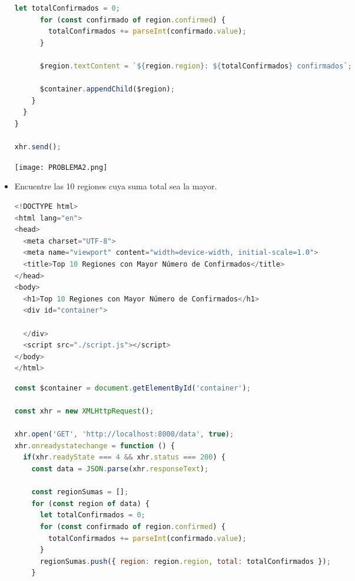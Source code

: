 \documentclass{article}
\begin{document}
\begin{itemize}
\begin{lstlisting}[language=JavaScript, caption=PROBLEMA2-SCRIPT]
      let totalConfirmados = 0;
      for (const confirmado of region.confirmed) {
        totalConfirmados += parseInt(confirmado.value);
      }

      $region.textContent = `${region.region}: ${totalConfirmados} confirmados`;
      
      $container.appendChild($region);
    }
  }
}

xhr.send();
            \end{lstlisting}  

            \newline \newline \newline
            \texttt{[image: PROBLEMA2.png]}
            \newline \newline \newline

            \item Encuentre las 10 regiones cuya suma total sea la mayor.
            
            \begin{lstlisting}[language=JavaScript, caption=PROBLEMA3-INDEX]
<!DOCTYPE html>
<html lang="en">
<head>
  <meta charset="UTF-8">
  <meta name="viewport" content="width=device-width, initial-scale=1.0">
  <title>Top 10 Regiones con Mayor Número de Confirmados</title>
</head>
<body>
  <h1>Top 10 Regiones con Mayor Número de Confirmados</h1>
  <div id="container">

  </div>
  <script src="./script.js"></script>
</body>
</html>
            \end{lstlisting}  

            \begin{lstlisting}[language=JavaScript, caption=PROBLEMA3-SCRIPT]
const $container = document.getElementById('container');

const xhr = new XMLHttpRequest(); 

xhr.open('GET', 'http://localhost:8000/data', true);
xhr.onreadystatechange = function () {
  if(xhr.readyState === 4 && xhr.status === 200) {
    const data = JSON.parse(xhr.responseText);

    const regionSumas = [];
    for (const region of data) {
      let totalConfirmados = 0;
      for (const confirmado of region.confirmed) {
        totalConfirmados += parseInt(confirmado.value);
      }
      regionSumas.push({ region: region.region, total: totalConfirmados });
    }


\end{lstlisting}
\end{itemize}
\end{document}
